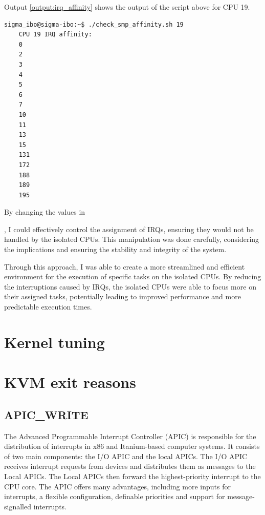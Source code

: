\documentclass[MMR,Master,english]{twbook}
\begin{document}
Output \ref{output:irq_affinity} shows the output of the script above for CPU 19.

\vspace{1em}
\begin{minipage}{0.95\columnwidth}
\begin{lstlisting}[name={Output of smp_affinity for CPU 19},label={output:irq_affinity}, breaklines=true]
	sigma_ibo@sigma-ibo:~$ ./check_smp_affinity.sh 19
	CPU 19 IRQ affinity:
	0
	2
	3
	4
	5
	6
	7
	10
	11
	13
	15
	131
	172
	188
	189
	195
\end{lstlisting}
\end{minipage}





By changing the values in 


, I could effectively control the assignment of IRQs, ensuring they would not be handled by the isolated CPUs. This manipulation was done carefully, considering the implications and ensuring the stability and integrity of the system.

Through this approach, I was able to create a more streamlined and efficient environment for the execution of specific tasks on the isolated CPUs. By reducing the interruptions caused by IRQs, the isolated CPUs were able to focus more on their assigned tasks, potentially leading to improved performance and more predictable execution times.

\section{Kernel tuning}

\clearpage
\section{KVM exit reasons}\label{sec:kvm_exit_reasons}
\subsection{APIC\_WRITE}


The Advanced Programmable Interrupt Controller (APIC) is responsible for the distribution of interrupts in x86 and Itanium-based computer systems. It consists of two main components: the I/O APIC and the local APICs. The I/O APIC receives interrupt requests from devices and distributes them as messages to the Local APICs. The Local APICs then forward the highest-priority interrupt to the CPU core. The APIC offers many advantages, including more inputs for interrupts, a flexible configuration, definable priorities and support for message-signalled interrupts.
\end{document}
